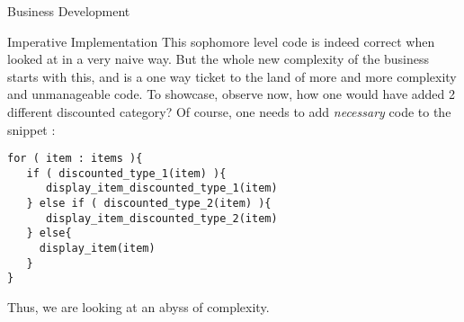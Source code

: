 \begin{section}{Business Development}
\begin{subsection}{Imperative Implementation}
This sophomore level code is indeed correct when looked at in a very naive way.
But the whole new complexity of the business starts with this, and is a one way ticket to the land of more and more complexity and unmanageable code. To showcase, observe now, how one would have added 2 different discounted category? Of course, one needs to add \emph{necessary} code to the snippet :

\begin{lstlisting}[style=JexlStyle]
for ( item : items ){
   if ( discounted_type_1(item) ){
      display_item_discounted_type_1(item)
   } else if ( discounted_type_2(item) ){
      display_item_discounted_type_2(item)
   } else{
     display_item(item)
   }
}
\end{lstlisting}

Thus, we are looking at an abyss of complexity. 
\end{subsection}

\end{section}


